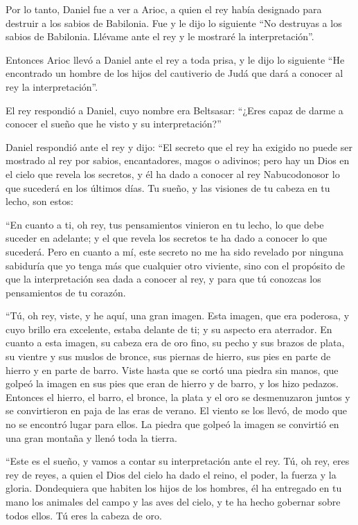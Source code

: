  Por lo tanto, Daniel fue a ver a Arioc, a quien el rey
había designado para destruir a los sabios de Babilonia. Fue y le dijo
lo siguiente ``No destruyas a los sabios de Babilonia. Llévame ante el
rey y le mostraré la interpretación''.

 Entonces Arioc llevó a Daniel ante el rey a toda prisa,
y le dijo lo siguiente ``He encontrado un hombre de los hijos del
cautiverio de Judá que dará a conocer al rey la interpretación''.

 El rey respondió a Daniel, cuyo nombre era Beltsasar:
``¿Eres capaz de darme a conocer el sueño que he visto y su
interpretación?''

 Daniel respondió ante el rey y dijo: ``El secreto que el
rey ha exigido no puede ser mostrado al rey por sabios, encantadores,
magos o adivinos;  pero hay un Dios en el cielo que
revela los secretos, y él ha dado a conocer al rey Nabucodonosor lo que
sucederá en los últimos días. Tu sueño, y las visiones de tu cabeza en
tu lecho, son estos:

 ``En cuanto a ti, oh rey, tus pensamientos vinieron en
tu lecho, lo que debe suceder en adelante; y el que revela los secretos
te ha dado a conocer lo que sucederá.  Pero en cuanto a
mí, este secreto no me ha sido revelado por ninguna sabiduría que yo
tenga más que cualquier otro viviente, sino con el propósito de que la
interpretación sea dada a conocer al rey, y para que tú conozcas los
pensamientos de tu corazón.

 ``Tú, oh rey, viste, y he aquí, una gran imagen. Esta
imagen, que era poderosa, y cuyo brillo era excelente, estaba delante de
ti; y su aspecto era aterrador.  En cuanto a esta imagen,
su cabeza era de oro fino, su pecho y sus brazos de plata, su vientre y
sus muslos de bronce,  sus piernas de hierro, sus pies en
parte de hierro y en parte de barro.  Viste hasta que se
cortó una piedra sin manos, que golpeó la imagen en sus pies que eran de
hierro y de barro, y los hizo pedazos.  Entonces el
hierro, el barro, el bronce, la plata y el oro se desmenuzaron juntos y
se convirtieron en paja de las eras de verano. El viento se los llevó,
de modo que no se encontró lugar para ellos. La piedra que golpeó la
imagen se convirtió en una gran montaña y llenó toda la tierra.

 ``Este es el sueño, y vamos a contar su interpretación
ante el rey.  Tú, oh rey, eres rey de reyes, a quien el
Dios del cielo ha dado el reino, el poder, la fuerza y la gloria.
 Dondequiera que habiten los hijos de los hombres, él ha
entregado en tu mano los animales del campo y las aves del cielo, y te
ha hecho gobernar sobre todos ellos. Tú eres la cabeza de oro.

